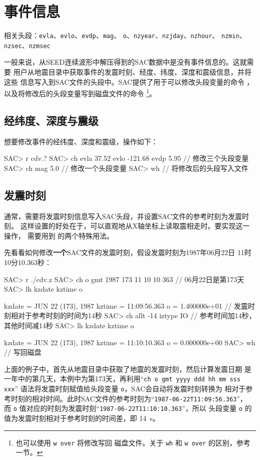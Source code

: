 \section{事件信息}
\label{sec:event-info}
相关头段：\texttt{evla}、\texttt{evlo}、\texttt{evdp}、\texttt{mag}、
    \texttt{o}、\texttt{nzyear}、\texttt{nzjday}、\texttt{nzhour}、
    \texttt{nzmin}、\texttt{nzsec}、\texttt{nzmsec}

一般来说，从SEED连续波形中解压得到的SAC数据中是没有事件信息的。这就需要
用户从地震目录中获取事件的发震时刻、经度、纬度、深度和震级信息，并将这些
信息写入到SAC文件的头段中。SAC提供了用于可以修改头段变量的命令
，以及将修改后的头段变量写到磁盘文件的命令
\footnote{也可以使用 \texttt{w over} 将修改写回
磁盘文件。关于 \texttt{wh} 和 \texttt{w over} 的区别，参考
 一节。}。

\subsection{经纬度、深度与震级}
想要修改事件的经纬度、深度和震级，操作如下：
\begin{SACCode}
SAC> r cdv.?
SAC> ch evla 37.52 evlo -121.68 evdp 5.95   // 修改三个头段变量
SAC> ch mag 5.0                             // 修改一个头段变量
SAC> wh                                     // 将修改后的头段写入文件
\end{SACCode}

\subsection{发震时刻}
通常，需要将发震时刻信息写入SAC头段，并设置SAC文件的参考时刻为发震时刻。
这样设置的好处在于，可以直观地从X轴坐标上读取震相走时。要实现这一操作，
需要用到  的两个特殊用法。

先看看如何修改\textbf{一个}SAC文件的发震时刻，假设发震时刻为1987年06月22日
11时10分10.363秒：
\label{code:origin-time}
\begin{SACCode}
SAC> r ./cdv.z
SAC> ch o gmt 1987 173 11 10 10 363   // 06月22日是第173天
SAC> lh kzdate kztime o

     kzdate = JUN 22 (173), 1987
     kztime = 11:09:56.363
          o = 1.400000e+01       // 发震时刻相对于参考时刻的时间为14秒
SAC> ch allt -14 iztype IO       // 参考时间加14秒，其他时间减14秒
SAC> lh kzdate kztime o

     kzdate = JUN 22 (173), 1987
     kztime = 11:10:10.363
          o = 0.000000e+00
SAC> wh                          // 写回磁盘
\end{SACCode}
上面的例子中，首先从地震目录中获取了地震的发震时刻，然后计算发震日期
是一年中的第几天，本例中为第173天，再利用``\texttt{ch o gmt yyyy ddd hh mm sss xxx}''
语法将发震时刻赋值给头段变量 \texttt{o}，SAC会自动将发震时刻转换为
相对于参考时刻的相对时间。此时SAC文件的参考时刻为``\texttt{1987-06-22T11:09:56.363}''，
而 \texttt{o} 值对应的时刻为发震时刻``\texttt{1987-06-22T11:10:10.363}''，所以
头段变量 \texttt{o} 的值为发震时刻相对于参考时刻的时间差，即 \SI{14}{\s}。

